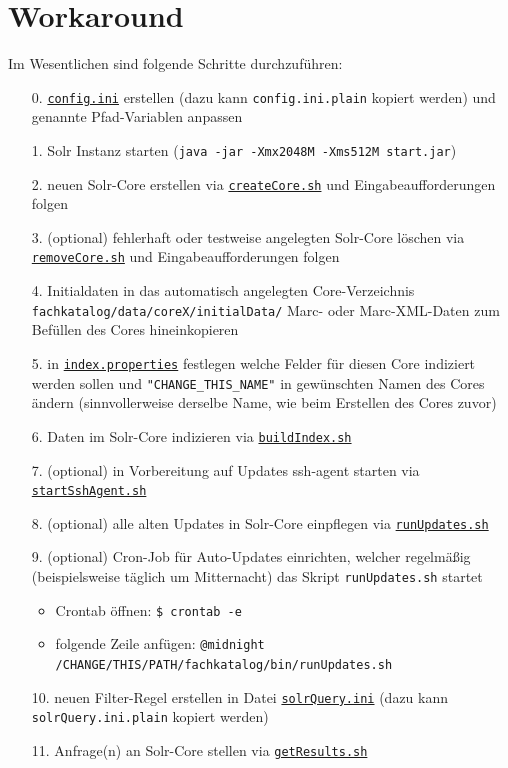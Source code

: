 \documentclass[10pt]{article}
\begin{document}
\section{Workaround}
Im Wesentlichen sind folgende Schritte durchzuführen: 
\begin{itemize}
	\item[0.] \hyperref[sec:para:config.ini]{\texttt{config.ini}} erstellen (dazu kann \texttt{config.ini.plain} kopiert werden) und genannte Pfad-Variablen anpassen
	\item[1.] Solr Instanz starten (\texttt{java -jar -Xmx2048M -Xms512M start.jar})
	\item[2.] neuen Solr-Core erstellen via \hyperref[sec:para:createCore]{\texttt{createCore.sh}} und Eingabeaufforderungen folgen
	\item[3.] (optional) fehlerhaft oder testweise angelegten Solr-Core löschen via \hyperref[sec:para:removeCore]{\texttt{removeCore.sh}} und Eingabeaufforderungen folgen
	\item[4.] Initialdaten in das automatisch angelegten Core-Verzeichnis \texttt{fachkatalog/data/coreX/initialData/} Marc- oder Marc-XML-Daten zum Befüllen des Cores hineinkopieren
	\item[5.] in \hyperref[para:index.properties]{\texttt{index.properties}} festlegen welche Felder für diesen Core indiziert werden sollen und \texttt{"CHANGE\_THIS\_NAME"} in gewünschten Namen des Cores ändern (sinnvollerweise derselbe Name, wie beim Erstellen des Cores zuvor)
	\item[6.] Daten im Solr-Core indizieren via \hyperref[sec:para:buildIndex]{\texttt{buildIndex.sh}}
	\item[7.] (optional) in Vorbereitung auf Updates ssh-agent starten via \hyperref[sec:para:startSshAgent]{\texttt{startSshAgent.sh}}
	\item[8.] (optional) alle alten Updates in Solr-Core einpflegen via \hyperref[sec:para:runUpdates]{\texttt{runUpdates.sh}}
	\item[9.] (optional) Cron-Job für Auto-Updates einrichten, welcher regelmäßig (beispielsweise täglich um Mitternacht) das Skript \texttt{runUpdates.sh} startet
	\begin{itemize}
		\item Crontab öffnen: \texttt{\$ crontab -e}
		\item folgende Zeile anfügen: \texttt{@midnight /CHANGE/THIS/PATH/fachkatalog/bin/runUpdates.sh}
	\end{itemize}
	\item[10.] neuen Filter-Regel erstellen in Datei \hyperref[sec:para:runUpdates]{\texttt{solrQuery.ini}} (dazu kann \texttt{solrQuery.ini.plain} kopiert werden)
	\item[11.] Anfrage(n) an Solr-Core stellen via \hyperref[sec:para:getResults]{\texttt{getResults.sh}}
	
\end{itemize}
\end{document}
